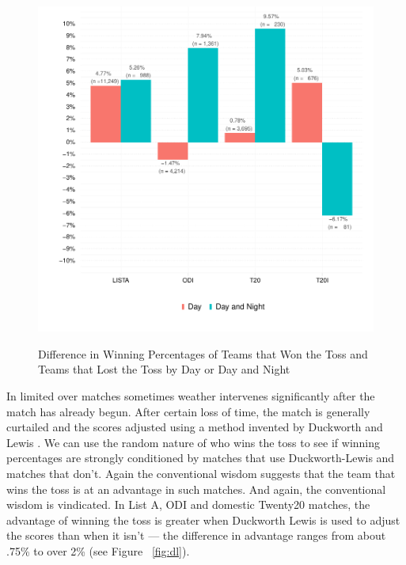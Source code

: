 \documentclass[12pt]{article}
\begin{document}
\begin{figure}[htbp]
\centering
\caption{Difference in Winning Percentages of Teams that Won the Toss and Teams that Lost the Toss by Day or Day and Night}
\includegraphics[scale=.85]{../figs/winbyDayNight.pdf}
\label{fig:dn}
\end{figure}

In limited over matches sometimes weather intervenes significantly after the match has already begun. After certain loss of time, the match is generally curtailed and the scores adjusted using a method invented by Duckworth and Lewis \citep[see][]{duckworth1998}. We can use the random nature of who wins the toss to see if winning percentages are strongly conditioned by matches that use Duckworth-Lewis and matches that don't. Again the conventional wisdom suggests that the team that wins the toss is at an advantage in such matches. And again, the conventional wisdom is vindicated. In List A, ODI and domestic Twenty20 matches, the advantage of winning the toss is greater when Duckworth Lewis is used to adjust the scores than when it isn't --- the difference in advantage ranges from about .75\% to over 2\% (see Figure ~\ref{fig:dl}).
\end{document}
